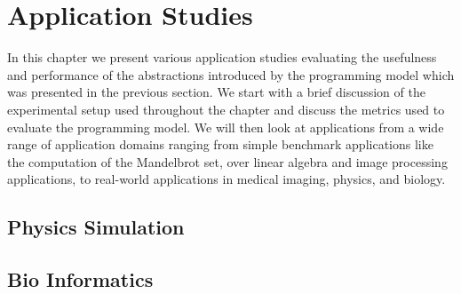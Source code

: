 \chapter{Application Studies}
\label{chapter:skelcl-evaluation}

In this chapter we present various application studies evaluating the usefulness and performance of the abstractions introduced by the \SkelCL programming model which was presented in the previous section.
We start with a brief discussion of the experimental setup used throughout the chapter and discuss the metrics used to evaluate the \SkelCL programming model.
We will then look at applications from a wide range of application domains ranging from simple benchmark applications like the computation of the Mandelbrot set, over linear algebra and image processing applications, to real-world applications in medical imaging, physics, and biology.











\section{Physics Simulation}

\section{Bio Informatics}

